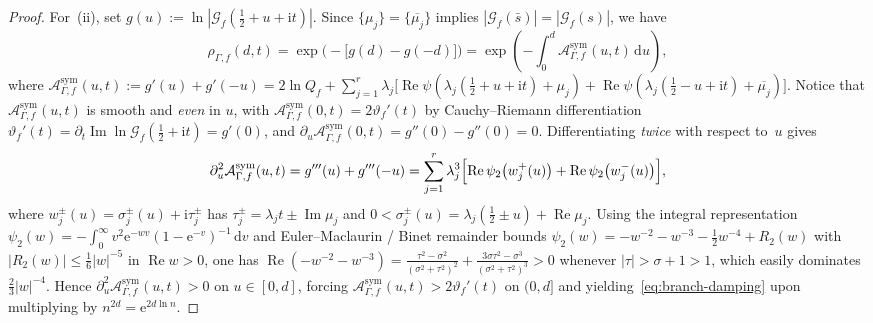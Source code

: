 \documentclass[11pt,reqno]{amsart}
\theoremstyle{definition}
\theoremstyle{remark}
\numberwithin{equation}{section}
\newcommand{\dd}{\mathrm{d}}
\newcommand{\ii}{\mathrm{i}}
\newcommand{\ee}{\mathrm{e}}
\DeclareMathOperator{\Reop}{Re}
\DeclareMathOperator{\Imop}{Im}
\begin{document}
\begin{proof}
For~(ii), set $g(u) := \ln|\mathcal{G}_f(\frac{1}{2}+u+\ii t)|$. Since $\{\mu_j\}=\{\overline{\mu_j}\}$ implies $|\mathcal{G}_f(\bar{s})| = |\mathcal{G}_f(s)|$, we have
\begin{equation}
  \rho_{\Gamma,f}(d,t) = \exp\bigl(-\bigl[g(d) - g(-d)\bigr]\bigr)
  = \exp\!\left(-\int_{0}^{d} \mathcal{A}_{\Gamma,f}^{\mathrm{sym}}(u,t)\,\dd u\right),
  \label{eq:rho-integral}
\end{equation}
where $\mathcal{A}_{\Gamma,f}^{\mathrm{sym}}(u,t) := g'(u) + g'(-u) = 2\ln Q_f + \sum_{j=1}^{r}\lambda_j\bigl[\Reop\psi(\lambda_j(\frac{1}{2}+u+\ii t)+\mu_j) + \Reop\psi(\lambda_j(\frac{1}{2}-u+\ii t)+\overline{\mu_j})\bigr]$. Notice that $\mathcal{A}_{\Gamma,f}^{\mathrm{sym}}(u,t)$ is smooth and \emph{even} in $u$, with $\mathcal{A}_{\Gamma,f}^{\mathrm{sym}}(0,t) = 2\vartheta_f'(t)$ by Cauchy--Riemann differentiation $\vartheta_f'(t) = \partial_t\Imop\ln\mathcal{G}_f(\frac{1}{2}+\ii t) = g'(0)$, and $\partial_u\mathcal{A}_{\Gamma,f}^{\mathrm{sym}}(0,t) = g''(0) - g''(0) = 0$. Differentiating \emph{twice} with respect to~$u$ gives
\begin{equation}
  \partial_u^2 \mathcal{A}_{\Gamma,f}^{\mathrm{sym}}(u,t)
  = g'''(u) + g'''(-u)
  = \sum_{j=1}^{r}\lambda_j^3\Bigl[\Reop\psi_2\bigl(w_j^+(u)\bigr) + \Reop\psi_2\bigl(w_j^-(u)\bigr)\Bigr],
  \label{eq:tetragamma-second-deriv}
\end{equation}
where $w_j^{\pm}(u) = \sigma_j^{\pm}(u) + \ii\tau_j^{\pm}$ has $\tau_j^{\pm} = \lambda_j t \pm \Imop\mu_j$ and $0 < \sigma_j^{\pm}(u) = \lambda_j(\frac{1}{2}\pm u) + \Reop\mu_j$. Using the integral representation $\psi_2(w) = -\int_0^\infty v^2 \ee^{-wv}(1 - \ee^{-v})^{-1}\,\dd v$ and Euler--Maclaurin / Binet remainder bounds $\psi_2(w) = -w^{-2} - w^{-3} - \frac{1}{2}w^{-4} + R_2(w)$ with $|R_2(w)| \le \frac{1}{6}|w|^{-5}$ in $\Reop w > 0$, one has $\Reop(-w^{-2} - w^{-3}) = \frac{\tau^2 - \sigma^2}{(\sigma^2+\tau^2)^2} + \frac{3\sigma\tau^2 - \sigma^3}{(\sigma^2+\tau^2)^3} > 0$ whenever $|\tau| > \sigma + 1 > 1$, which easily dominates $\frac{2}{3}|w|^{-4}$. Hence $\partial_u^2\mathcal{A}_{\Gamma,f}^{\mathrm{sym}}(u,t) > 0$ on $u \in [0,d]$, forcing $\mathcal{A}_{\Gamma,f}^{\mathrm{sym}}(u,t) > 2\vartheta_f'(t)$ on $(0,d]$ and yielding~\eqref{eq:branch-damping} upon multiplying by $n^{2d} = \ee^{2d\ln n}$.
\end{proof}
\end{document}
